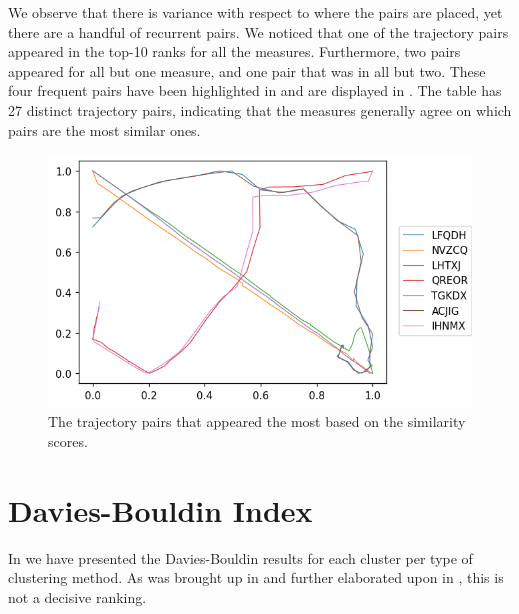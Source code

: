 We observe that there is variance with respect to where the pairs are placed, yet there are a handful of recurrent pairs.
We noticed that one of the trajectory pairs appeared in the top-10 ranks for all the measures. 
Furthermore, two pairs appeared for all but one measure, and one pair that was in all but two. 
These four frequent pairs have been highlighted in  and are displayed in . 
The table has 27 distinct trajectory pairs, indicating that the measures generally agree on which pairs are the most similar ones. 

\begin{figure}[ht]
  \centering
  \includegraphics[width=.6\linewidth]{figs/traj/4_most_common.png}
  \caption{The trajectory pairs that appeared the most based on the similarity scores. }
  \label{fig:most_common_pairs}
\end{figure}








\section{Davies-Bouldin Index}

In  we have presented the Davies-Bouldin results for each cluster per type of clustering method. 
As was brought up in  and further elaborated upon in , this is not a decisive ranking.


